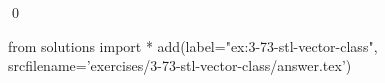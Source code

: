 
\begin{ex}
  \label{ex:3-73-stl-vector-class}
  
  \qed
\end{ex}
\begin{python0}
from solutions import *
add(label="ex:3-73-stl-vector-class",
    srcfilename='exercises/3-73-stl-vector-class/answer.tex')
\end{python0}
